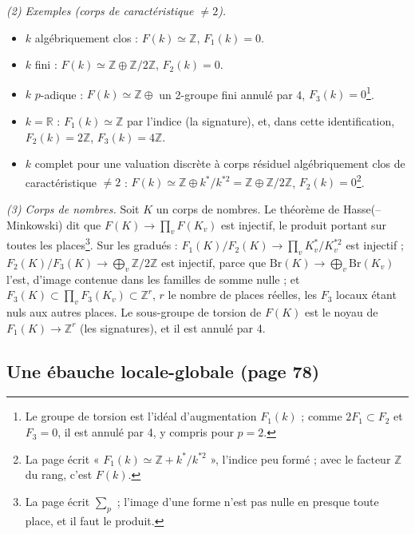 \documentclass[11pt,a4paper]{article}
\begin{document}
\emph{(2) Exemples (corps de caractéristique $\neq 2$).}
\begin{itemize}
\item[a)] $k$ algébriquement clos : $F(k) \simeq \mathbb{Z}$, $F_1(k) = 0$.
\item[b)] $k$ fini : $F(k) \simeq \mathbb{Z} \oplus \mathbb{Z}/2\mathbb{Z}$, $F_2(k) = 0$.
\item[c)] $k$ $p$-adique : $F(k) \simeq \mathbb{Z} \oplus$ un 2-groupe fini annulé par
4, $F_3(k) = 0$\footnote{Le groupe de torsion est l'idéal d'augmentation
$F_1(k)$ ; comme $2F_1 \subset F_2$ et $F_3 = 0$, il est annulé par 4, y compris
pour $p = 2$.}.
\item[d)] $k = \mathbb{R}$ : $F_1(k) \simeq \mathbb{Z}$ par l'indice (la
signature), et, dans cette identification, $F_2(k) = 2\mathbb{Z}$, $F_3(k) = 4\mathbb{Z}$.
\item[e)] $k$ complet pour une valuation discrète à corps résiduel
algébriquement clos de caractéristique $\neq 2$ : $F(k) \simeq \mathbb{Z} \oplus
k^{*}/k^{*2} = \mathbb{Z} \oplus \mathbb{Z}/2\mathbb{Z}$, $F_2(k) = 0$\footnote{La page
écrit « $F_1(k) \simeq \mathbb{Z} + k^{*}/k^{*2}$ », l'indice peu formé ; avec le
facteur $\mathbb{Z}$ du rang, c'est $F(k)$.}.
\end{itemize}

\emph{(3) Corps de nombres.} Soit $K$ un corps de nombres. Le théorème de
Hasse(--Minkowski) dit que $F(K) \to \prod_v F(K_v)$ est injectif, le produit
portant sur toutes les places\footnote{La page écrit $\sum_p$ ; l'image d'une
forme n'est pas nulle en presque toute place, et il faut le produit.}. Sur les
gradués : $F_1(K)/F_2(K) \to \prod_v K_v^{*}/K_v^{*2}$ est injectif ;
$F_2(K)/F_3(K) \to \bigoplus_v \mathbb{Z}/2\mathbb{Z}$ est injectif, parce que
$\mathrm{Br}(K) \to \bigoplus_v \mathrm{Br}(K_v)$ l'est, d'image contenue dans les
familles de somme nulle ; et $F_3(K) \subset \prod_v F_3(K_v) \subset
\mathbb{Z}^r$, $r$ le nombre de places réelles, les $F_3$ locaux étant nuls aux
autres places. Le sous-groupe de torsion de $F(K)$ est le noyau de
$F_1(K) \to \mathbb{Z}^r$ (les signatures), et il est annulé par 4.

\subsection*{Une ébauche locale-globale (page 78)}
\end{document}
